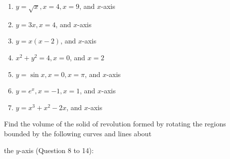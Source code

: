 \documentclass{report}
\begin{document}
\begin{enumerate}
    \item $y=\sqrt{x}, x=4, x=9$, and $x$-axis
    \item $y=3 x, x=4$, and $x$-axis
    \item $y=x(x-2)$, and $x$-axis
    \item $x^2+y^2=4, x=0$, and $x=2$
    \item $y=\sin x, x=0, x=\pi$, and $x$-axis
    \item $y=e^x, x=-1, x=1$, and $x$-axis
    \item $y=x^3+x^2-2 x$, and $x$-axis
\end{enumerate}

\hspace{-6pt} Find the volume of the solid of revolution formed by rotating the regions
bounded by the following curves and lines about

\hspace{-6pt} the $y$-axis (Question 8 to 14):
\end{document}
